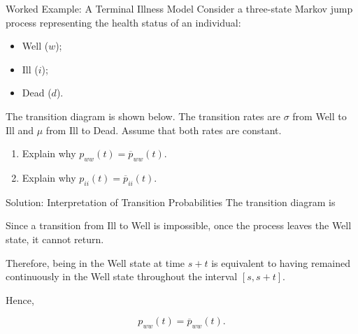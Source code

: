 \documentclass[
  ignorenonframetext,
  aspectratio=169,
]{beamer}
\providecommand{\tightlist}{%
  \setlength{\itemsep}{0pt}\setlength{\parskip}{0pt}}
\begin{document}
\begin{frame}{Worked Example: A Terminal Illness Model}
\protect{}\label{worked-example-a-terminal-illness-model}
Consider a three-state Markov jump process representing the health
status of an individual:

\begin{itemize}
\tightlist
\item
  Well (\(w\));
\item
  Ill (\(i\));
\item
  Dead (\(d\)).
\end{itemize}

The transition diagram is shown below. The transition rates are
\(\sigma\) from Well to Ill and \(\mu\) from Ill to Dead. Assume that
both rates are constant.

\begin{enumerate}
\tightlist
\item
  Explain why \(p_{ww}(t)=\overline p_{ww}(t)\).
\item
  Explain why \(p_{ii}(t)=\overline p_{ii}(t)\).
\end{enumerate}
\end{frame}

\begin{frame}{Solution: Interpretation of Transition Probabilities}
\protect{}\label{solution-interpretation-of-transition-probabilities}
The transition diagram is

\begin{center}
\end{center}

Since a transition from Ill to Well is impossible, once the process
leaves the Well state, it cannot return.

Therefore, being in the Well state at time \(s+t\) is equivalent to
having remained continuously in the Well state throughout the interval
\([s,s+t]\).

Hence,

\[
\boxed{
p_{ww}(t)=\overline p_{ww}(t).
}
\]
\end{frame}
\end{document}
